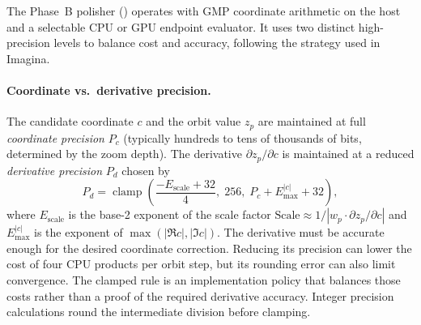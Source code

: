 The Phase~B polisher () operates with GMP
 coordinate arithmetic on the host and a selectable CPU or GPU
endpoint evaluator.  It uses two distinct high-precision levels to balance cost
and accuracy, following the strategy used in Imagina.

\paragraph{Coordinate vs.\ derivative precision.}
The candidate coordinate $c$ and the orbit value $z_p$ are maintained at full
\emph{coordinate precision} $P_c$ (typically hundreds to tens of thousands of
bits, determined by the zoom depth).  The derivative
$\partial z_p/\partial c$ is maintained at a reduced \emph{derivative
precision} $P_d$ chosen by
\begin{equation}\label{eq:ff-deriv-prec}
P_d = \operatorname{clamp}\!\left(
  \frac{-E_{\mathrm{scale}} + 32}{4},\;
  256,\;
  P_c + E_{\max}^{|c|} + 32
\right),
\end{equation}
where $E_{\mathrm{scale}}$ is the base-2 exponent of the scale factor
$\text{Scale} \approx 1/|w_p \cdot \partial z_p/\partial c|$ and
$E_{\max}^{|c|}$ is the exponent of $\max(|\Re c|,|\Im c|)$.
The derivative must be accurate enough for the desired coordinate correction.
Reducing its precision can lower the cost of four CPU products per orbit step,
but its rounding error can also limit convergence.  The clamped rule is an
implementation policy that balances those costs rather than a proof of the
required derivative accuracy.  Integer precision calculations round the
intermediate division before clamping.

